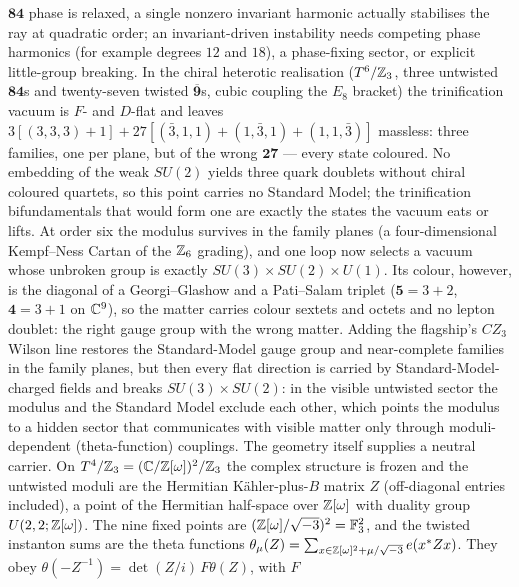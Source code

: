 $\mathbf{84}$ phase is relaxed, a single nonzero invariant harmonic actually stabilises the ray at quadratic order;
an invariant-driven instability needs competing phase harmonics (for example degrees $12$ and $18$), a phase-fixing
sector, or explicit little-group breaking.
In the chiral heterotic realisation ($T^6/\mathbb{Z}_3$, three untwisted $\mathbf{84}$s and twenty-seven twisted
$\overline{\mathbf9}$s, cubic coupling the $E_8$ bracket) the trinification vacuum is $F$- and $D$-flat and leaves
$3[(3,3,3)+1]+27[(\bar3,1,1)+(1,\bar3,1)+(1,1,\bar3)]$ massless: three families, one per plane, but of the wrong
$\mathbf{27}$ --- every state coloured. No embedding of the weak $SU(2)$ yields three quark doublets without chiral
coloured quartets, so this point carries no Standard Model; the trinification bifundamentals that would form one are
exactly the states the vacuum eats or lifts. 
At order six the modulus survives in the family planes (a four-dimensional Kempf--Ness Cartan of the $\mathbb{Z}_6$ grading),
and one loop now selects a vacuum whose unbroken group is exactly $SU(3)\times SU(2)\times U(1)$. Its colour, however,
is the diagonal of a Georgi--Glashow and a Pati--Salam triplet ($\mathbf5=3+2$, $\mathbf4=3+1$ on $\mathbb{C}^9$), so the
matter carries colour sextets and octets and no lepton doublet: the right gauge group with the wrong matter.
Adding the flagship's $CZ_3$ Wilson line restores the Standard-Model gauge group and near-complete families in the
family planes, but then every flat direction is carried by Standard-Model-charged fields and breaks $SU(3)\times SU(2)$:
in the visible untwisted sector the modulus and the Standard Model exclude each other, which points the modulus to a
hidden sector that communicates with visible matter only through moduli-dependent (theta-function) couplings.
The geometry itself supplies a neutral carrier. On $T^4/\mathbb{Z}_3=(\mathbb{C}/\mathbb{Z}[\omega])^2/\mathbb{Z}_3$ the complex structure is frozen and
the untwisted moduli are the Hermitian K\"ahler-plus-$B$ matrix $Z$ (off-diagonal entries included), a point of the
Hermitian half-space over $\mathbb{Z}[\omega]$ with duality group $U(2,2;\mathbb{Z}[\omega])$. The nine fixed points are
$(\mathbb{Z}[\omega]/\sqrt{-3})^2=\mathbb{F}_3^2$, and the twisted instanton sums are the theta functions
$\theta_\mu(Z)=\sum_{x\in\mathbb{Z}[\omega]^2+\mu/\sqrt{-3}}e(x^*Zx)$. They obey $\theta(-Z^{-1})=\det(Z/i)\,F\theta(Z)$, with $F$
